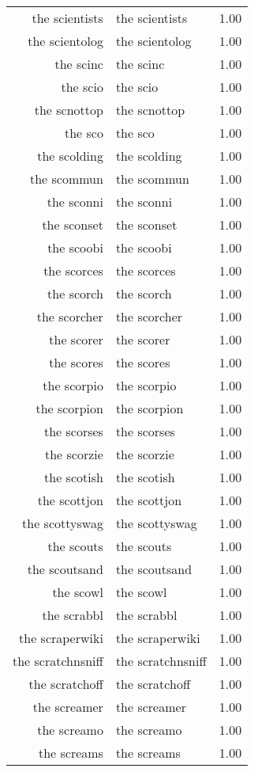 \begin{table}[ht]
\begin{tabular}{rlr}
  the scientists & the scientists & 1.00 \\ 
  the scientolog & the scientolog & 1.00 \\ 
  the scinc & the scinc & 1.00 \\ 
  the scio & the scio & 1.00 \\ 
  the scnottop & the scnottop & 1.00 \\ 
  the sco & the sco & 1.00 \\ 
  the scolding & the scolding & 1.00 \\ 
  the scommun & the scommun & 1.00 \\ 
  the sconni & the sconni & 1.00 \\ 
  the sconset & the sconset & 1.00 \\ 
  the scoobi & the scoobi & 1.00 \\ 
  the scorces & the scorces & 1.00 \\ 
  the scorch & the scorch & 1.00 \\ 
  the scorcher & the scorcher & 1.00 \\ 
  the scorer & the scorer & 1.00 \\ 
  the scores & the scores & 1.00 \\ 
  the scorpio & the scorpio & 1.00 \\ 
  the scorpion & the scorpion & 1.00 \\ 
  the scorses & the scorses & 1.00 \\ 
  the scorzie & the scorzie & 1.00 \\ 
  the scotish & the scotish & 1.00 \\ 
  the scottjon & the scottjon & 1.00 \\ 
  the scottyswag & the scottyswag & 1.00 \\ 
  the scouts & the scouts & 1.00 \\ 
  the scoutsand & the scoutsand & 1.00 \\ 
  the scowl & the scowl & 1.00 \\ 
  the scrabbl & the scrabbl & 1.00 \\ 
  the scraperwiki & the scraperwiki & 1.00 \\ 
  the scratchnsniff & the scratchnsniff & 1.00 \\ 
  the scratchoff & the scratchoff & 1.00 \\ 
  the screamer & the screamer & 1.00 \\ 
  the screamo & the screamo & 1.00 \\ 
  the screams & the screams & 1.00 \\ 

\end{tabular}
\end{table}
